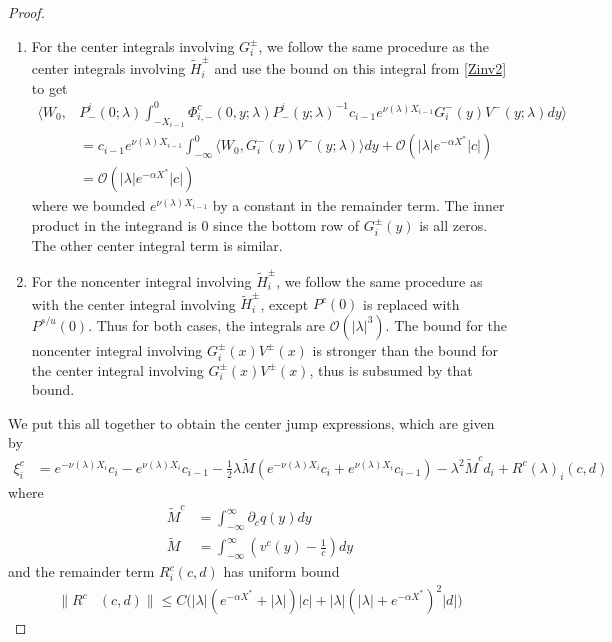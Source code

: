 \documentclass[thesis.tex]{subfiles}
\begin{document}
\begin{lemma}
\begin{proof}
\begin{enumerate}
\item For the center integrals involving $G_i^\pm$, we follow the same procedure as the center integrals involving $\tilde{H}_i^\pm$ and use the bound on this integral from \cref{Zinv2} to get
\begin{align*}
\langle W_0, &P^i_-(0; \lambda) \int_{-X_{i-1}}^0 \Phi^c_{i,-}(0, y; \lambda) P^i_-(y; \lambda)^{-1} c_{i-1} e^{\nu(\lambda)X_{i-1}} G_i^-(y) V^-(y; \lambda) dy \rangle \\
&= c_{i-1} e^{\nu(\lambda)X_{i-1}}\int_{-\infty}^0 \langle W_0, G_i^-(y) V^-(y; \lambda)  \rangle dy + \mathcal{O}(|\lambda| e^{-\alpha X^*} |c|) \\
&= \mathcal{O}(|\lambda| e^{-\alpha X^*} |c|)
\end{align*}
where we bounded $e^{\nu(\lambda)X_{i-1}}$ by a constant in the remainder term. The inner product in the integrand is 0 since the bottom row of $G_i^\pm(y)$ is all zeros. The other center integral term is similar.

\item For the noncenter integral involving $\tilde{H}_i^\pm$, we follow the same procedure as with the center integral involving $\tilde{H}_i^\pm$, except $P^c(0)$ is replaced with $P^{s/u}(0)$. Thus for both cases, the integrals are $\mathcal{O}(|\lambda|^3)$. The bound for the noncenter integral involving $G_i^\pm(x) V^\pm(x)$ is stronger than the bound for the center integral involving $G_i^\pm(x) V^\pm(x)$, thus is subsumed by that bound.
\end{enumerate}

We put this all together to obtain the center jump expressions, which are given by
\begin{align*}
\xi^c_i &= e^{-\nu(\lambda)X_i} c_i - e^{\nu(\lambda)X_i} c_{i-1} - \frac{1}{2}\lambda \tilde{M} \left( e^{-\nu(\lambda)X_i}c_i + e^{\nu(\lambda)X_i}c_{i-1}\right) -\lambda^2 \tilde{M}^c d_i + R^c(\lambda)_i(c, d)
\end{align*}
where
\begin{align*}
\tilde{M}^c &= \int_{-\infty}^\infty \partial_c q(y) dy \\
\tilde{M} &= \int_{-\infty}^{\infty} \left(v^c(y) - \frac{1}{c}\right) dy
\end{align*}
and the remainder term $R^c_i(c, d)$ has uniform bound
\begin{equation}\label{centerR}
\begin{aligned}
\|R^c&(c, d)\| \leq C \Big( |\lambda| (e^{-\alpha X^*} + |\lambda|) |c| + |\lambda| (|\lambda| + e^{-\alpha X^*})^2 |d| \Big)
\end{aligned}
\end{equation}


\end{proof}
\end{lemma}
\end{document}
